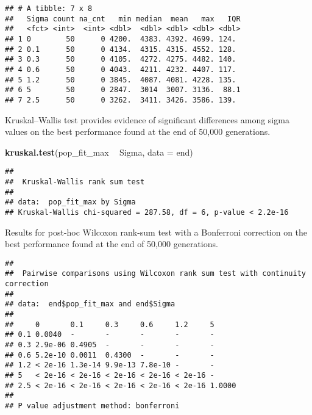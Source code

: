 \documentclass[]{book}
\newenvironment{Shaded}{\begin{snugshade}}{\end{snugshade}}
\newcommand{\DataTypeTok}[1]{\textcolor[rgb]{0.13,0.29,0.53}{#1}}
\newcommand{\KeywordTok}[1]{\textcolor[rgb]{0.13,0.29,0.53}{\textbf{#1}}}
\newcommand{\NormalTok}[1]{#1}
\newcommand{\OperatorTok}[1]{\textcolor[rgb]{0.81,0.36,0.00}{\textbf{#1}}}
\newcommand{\OtherTok}[1]{\textcolor[rgb]{0.56,0.35,0.01}{#1}}
\newcommand{\StringTok}[1]{\textcolor[rgb]{0.31,0.60,0.02}{#1}}
\begin{document}
\begin{verbatim}
## # A tibble: 7 x 8
##   Sigma count na_cnt   min median  mean   max   IQR
##   <fct> <int>  <int> <dbl>  <dbl> <dbl> <dbl> <dbl>
## 1 0        50      0 4200.  4383. 4392. 4699. 124. 
## 2 0.1      50      0 4134.  4315. 4315. 4552. 128. 
## 3 0.3      50      0 4105.  4272. 4275. 4482. 140. 
## 4 0.6      50      0 4043.  4211. 4232. 4407. 117. 
## 5 1.2      50      0 3845.  4087. 4081. 4228. 135. 
## 6 5        50      0 2847.  3014  3007. 3136.  88.1
## 7 2.5      50      0 3262.  3411. 3426. 3586. 139.
\end{verbatim}

Kruskal--Wallis test provides evidence of significant differences among sigma values on the best performance found at the end of 50,000 generations.

\begin{Shaded}
\begin{Highlighting}[]
\KeywordTok{kruskal.test}\NormalTok{(pop_fit_max }\OperatorTok{~}\StringTok{ }\NormalTok{Sigma, }\DataTypeTok{data =}\NormalTok{ end)}
\end{Highlighting}
\end{Shaded}

\begin{verbatim}
## 
##  Kruskal-Wallis rank sum test
## 
## data:  pop_fit_max by Sigma
## Kruskal-Wallis chi-squared = 287.58, df = 6, p-value < 2.2e-16
\end{verbatim}

Results for post-hoc Wilcoxon rank-sum test with a Bonferroni correction on the best performance found at the end of 50,000 generations.

\begin{Shaded}
\end{Shaded}

\begin{verbatim}
## 
##  Pairwise comparisons using Wilcoxon rank sum test with continuity correction 
## 
## data:  end$pop_fit_max and end$Sigma 
## 
##     0       0.1     0.3     0.6     1.2     5     
## 0.1 0.0040  -       -       -       -       -     
## 0.3 2.9e-06 0.4905  -       -       -       -     
## 0.6 5.2e-10 0.0011  0.4300  -       -       -     
## 1.2 < 2e-16 1.3e-14 9.9e-13 7.8e-10 -       -     
## 5   < 2e-16 < 2e-16 < 2e-16 < 2e-16 < 2e-16 -     
## 2.5 < 2e-16 < 2e-16 < 2e-16 < 2e-16 < 2e-16 1.0000
## 
## P value adjustment method: bonferroni
\end{verbatim}
\end{document}
